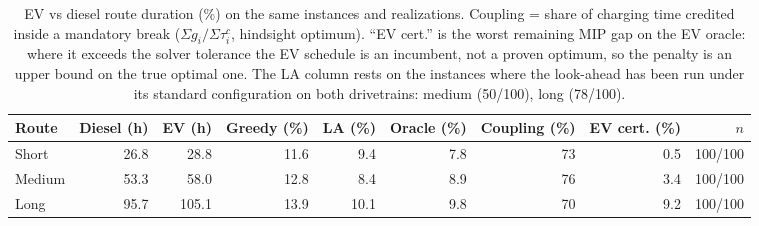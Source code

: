\begin{table}[ht]\centering
\caption{EV vs diesel route duration (\%) on the same instances and realizations.  Coupling = share of charging time credited inside a mandatory break ($\Sigma g_i/\Sigma\tau^c_i$, hindsight optimum). ``EV cert.'' is the worst remaining MIP gap on the EV oracle: where it exceeds the solver tolerance the EV schedule is an incumbent, not a proven optimum, so the penalty is an upper bound on the true optimal one.  The LA column rests on the instances where the look-ahead has been run under its standard configuration on both drivetrains: medium (50/100), long (78/100).}
\label{tab:diesel}
\begin{tabular}{lrrrrrrrr}
\hline
Route & Diesel (h) & EV (h) & Greedy (\%) & LA (\%) & Oracle (\%) & Coupling (\%) & EV cert. (\%) & $n$ \\
\hline
Short & 26.8 & 28.8 & 11.6 & 9.4 & 7.8 & 73 & 0.5 & 100/100 \\
Medium & 53.3 & 58.0 & 12.8 & 8.4 & 8.9 & 76 & 3.4 & 100/100 \\
Long & 95.7 & 105.1 & 13.9 & 10.1 & 9.8 & 70 & 9.2 & 100/100 \\
\hline
\end{tabular}
\end{table}
